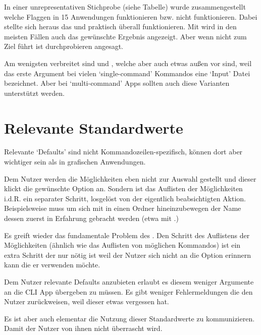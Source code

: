 \documentclass[oneside,bibliography=totocnumbered,BCOR=5mm]{scrbook}
\begin{document}
In einer unrepresentativen Stichprobe (siehe Tabelle) wurde
zusammengestellt welche Flaggen in 15 Anwendungen funktionieren bzw.
nicht funktionieren. Dabei stellte sich heraus das  und
 praktisch überall funktionieren. Mit 
wird in den meisten Fällen auch das gewünschte Ergebnis angezeigt. Aber wenn
 nicht zum Ziel führt ist durchprobieren angesagt.

\smallskip

Am wenigsten verbreitet sind  und ,
welche aber auch etwas außen vor sind, weil das erste Argument bei vielen
`single-command' Kommandos eine `Input' Datei bezeichnet. Aber bei
`multi-command' Apps sollten auch diese Varianten unterstützt werden.

\section{Relevante Standardwerte}

Relevante `Defaults' sind nicht Kommandozeilen-spezifisch, können dort aber
wichtiger sein als in grafischen Anwendungen.

\smallskip

Dem Nutzer werden die Möglichkeiten eben nicht zur Auswahl gestellt und dieser
klickt die gewünschte Option an. Sondern ist das Auflisten der Möglichkeiten
i.d.R. ein separater Schritt, losgelöst von der eigentlich beabsichtigten
Aktion. Beispielsweise muss um sich mit  in einen Ordner
hineinzubewegen der Name dessen zuerst in Erfahrung gebracht werden (etwa mit
.)

\smallskip

Es greift wieder das fundamentale Problem des . Den Schritt des
Auflistens der Möglichkeiten (ähnlich wie das Auflisten von möglichen Kommandos)
ist ein extra Schritt der nur nötig ist weil der Nutzer sich nicht an die Option
erinnern kann die er verwenden möchte.

\bigskip


Dem Nutzer relevante Defaults anzubieten erlaubt es diesem weniger Argumente an
die CLI App übergeben zu müssen. Es gibt weniger Fehlermeldungen die den Nutzer
zurückweisen, weil dieser etwas vergessen hat.

\smallskip

Es ist aber auch elementar die Nutzung dieser Standardwerte zu kommunizieren.
Damit der Nutzer von ihnen nicht überrascht wird.
\end{document}
